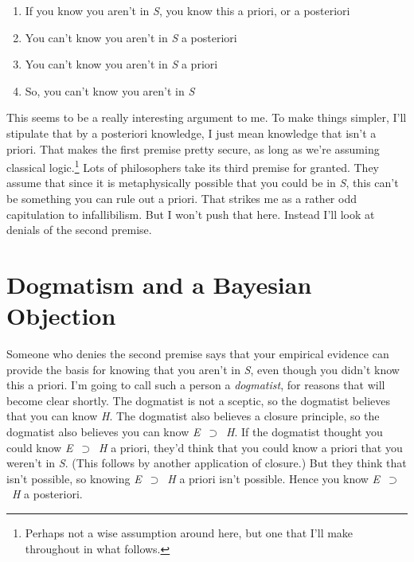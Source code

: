 \bigskip
\noindent \begin{minipage}{\textwidth}

\begin{enumerate}
\item If you know you aren't in \textit{S}, you know this a priori, or a posteriori
\item You can't know you aren't in \textit{S }a posteriori
\item You can't know you aren't in \textit{S} a priori
\item So, you can't know you aren't in \textit{S}
\end{enumerate}
\end{minipage}
\bigskip

\noindent This seems to be a really interesting argument to me. To make things simpler, I'll stipulate that by a posteriori knowledge, I just mean knowledge that isn't a priori. That makes the first premise pretty secure, as long as we're assuming classical logic.\footnote{ Perhaps not a wise assumption around here, but one that I'll make throughout in what follows.} Lots of philosophers take its third premise for granted. They assume that since it is metaphysically possible that you could be in \textit{S}, this can't be something you can rule out a priori. That strikes me as a rather odd capitulation to infallibilism. But I won't push that here. Instead I'll look at denials of the second premise.

\section{Dogmatism and a Bayesian Objection}

Someone who denies the second premise says that your empirical evidence can provide the basis for knowing that you aren't in \textit{S}, even though you didn't know this a priori. I'm going to call such a person a \textit{dogmatist}, for reasons that will become clear shortly. The dogmatist is not a sceptic, so the dogmatist believes that you can know \textit{H}. The dogmatist also believes a closure principle, so the dogmatist also believes you can know \textit{E}~${\supset}$~\textit{H}. If the dogmatist thought you could know \textit{E}~${\supset}$~\textit{H} a priori, they'd think that you could know a priori that you weren't in \textit{S}. (This follows by another application of closure.) But they think that isn't possible, so knowing \textit{E}~${\supset}$~\textit{H} a priori isn't possible. Hence you know \textit{E}~${\supset}$~\textit{H} a posteriori. 

